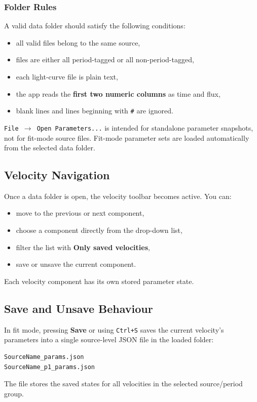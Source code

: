 \documentclass[12pt,a4paper]{article}
\newcommand{\menu}[1]{\texttt{#1}}
\newcommand{\key}[1]{\texttt{#1}}
\begin{document}
\subsubsection*{Folder Rules}

A valid data folder should satisfy the following conditions:
\begin{itemize}[noitemsep]
  \item all valid files belong to the same source,
  \item files are either all period-tagged or all non-period-tagged,
  \item each light-curve file is plain text,
  \item the app reads the \textbf{first two numeric columns} as time and flux,
  \item blank lines and lines beginning with \texttt{\#} are ignored.
\end{itemize}

\begin{warnbox}
\menu{File $\to$ Open Parameters...} is intended for standalone parameter snapshots, not for fit-mode source files.
Fit-mode parameter sets are loaded automatically from the selected data folder.
\end{warnbox}

\subsection{Velocity Navigation}

Once a data folder is open, the velocity toolbar becomes active.
You can:
\begin{itemize}[noitemsep]
  \item move to the previous or next component,
  \item choose a component directly from the drop-down list,
  \item filter the list with \textbf{Only saved velocities},
  \item save or unsave the current component.
\end{itemize}

Each velocity component has its own stored parameter state.

\subsection{Save and Unsave Behaviour}

In fit mode, pressing \textbf{Save} or using \key{Ctrl+S} saves the current velocity's parameters into a
single source-level JSON file in the loaded folder:
\begin{verbatim}
SourceName_params.json
SourceName_p1_params.json
\end{verbatim}
The file stores the saved states for all velocities in the selected source/period group.
\end{document}
